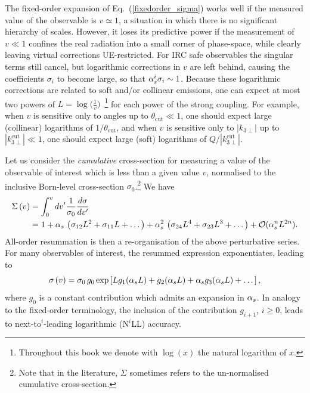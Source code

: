 The fixed-order expansion of Eq.~(\ref{fixedorder_sigma}) works well
if the measured value of the observable is $v\simeq 1$, a situation in which there is no significant hierarchy of scales.
%
However, it loses its predictive power if the measurement of
$v\ll 1$ confines the real radiation into a small corner of
phase-space, while clearly leaving virtual corrections
UE-restricted. 
%
For IRC safe observables the singular terms still
cancel, but logarithmic corrections in $v$ are
left behind, causing the coefficients $\sigma_i$ to become large, so
that $\alpha_s^i \sigma_i \sim 1$. 
Because these logarithmic corrections
are related to soft and/or collinear emissions, one can expect at most
two powers of $L=\log\big(\frac{1}{v}\big)$~\footnote{Throughout this book we denote with $\log(x)$ the natural logarithm of $x$.} for each power of the
strong coupling.
%
For example, when $v$ is sensitive
only to angles up to $\theta_\text{cut}\ll 1$, one should expect large
(collinear) logarithms of $1/\theta_\text{cut}$, and when
$v$ is sensitive only to $|k_{3\perp}|$ up to
$|k_{3\perp}^\text{cut}|\ll 1$, one should expect large (soft) logarithms of $Q/|k_{3\perp}^\text{cut}|$. 


Let us consider the {\it cumulative} cross-section for measuring a
value of the observable of interest which is less than a given value
$v$, normalised to the inclusive Born-level cross-section
$\sigma_0$.\footnote{Note that in the literature, $\Sigma$
  sometimes refers to the un-normalised cumulative cross-section.}
We have
\begin{align} 
  \Sigma\left(v\right)
  & = \int_0^v dv' \frac{1}{\sigma_0}\frac{d\sigma}{dv'} \\
  & = 1 + \alpha_s \, \left( \sigma_{12} L^2+\sigma_{11} L+ \dots \right)  
+\alpha_s^2 \,\left( \sigma_{24} L^4+\sigma_{23} L^3+ \dots \right)   + \mathcal{O}(\alpha_s^n L^{2n}).\label{expanded_sigma}
\end{align}
All-order resummation is then a re-organisation of the above perturbative series. For many observables of interest, the resummed expression exponentiates, leading to
\begin{equation} \label{resummed_sigma}
\sigma\left(v \right) = \sigma_0 \, g_0 \exp \left[ L g_1(\alpha_s L)+g_2(\alpha_s L)+\alpha_s g_3(\alpha_s L)+ \dots \right],
\end{equation}
where $g_0$ is a constant contribution which admits an expansion in $\alpha_s$. In analogy to the fixed-order terminology, the inclusion of the contribution $g_{i+1}$, $i\ge0$, leads to next-to$^i$-leading logarithmic (N$^i$LL) accuracy.

